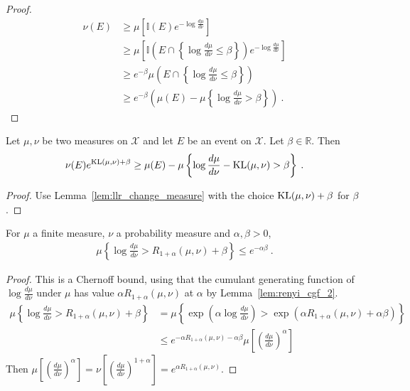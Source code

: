 \begin{proof}\leanok
\begin{align*}
\nu(E)
&\ge \mu\left[\mathbb{I}(E) e^{- \log\frac{d \mu}{d \nu} }\right]
\\
&\ge \mu\left[\mathbb{I}\left(E \cap \left\{\log\frac{d \mu}{d \nu} \le \beta\right\}\right) e^{- \log\frac{d \mu}{d \nu} }\right]
\\
&\ge e^{- \beta}\mu\left(E \cap \left\{\log\frac{d \mu}{d \nu} \le \beta\right\}\right)
\\
&\ge e^{- \beta}\left( \mu(E) - \mu\left\{ \log\frac{d \mu}{d \nu} > \beta \right\} \right)
\: .
\end{align*}
\end{proof}

\begin{corollary}
  \label{cor:kl_change_measure}
  Let $\mu, \nu$ be two measures on $\mathcal X$ and let $E$ be an event on $\mathcal X$. Let $\beta \in \mathbb{R}$. Then
  \begin{align*}
  \nu(E) e^{\operatorname{KL}(\mu, \nu) + \beta} \ge \mu(E) - \mu\left\{ \log\frac{d \mu}{d \nu} - \operatorname{KL}(\mu, \nu) > \beta \right\} \: .
  \end{align*}
\end{corollary}

\begin{proof}
Use Lemma~\ref{lem:llr_change_measure} with the choice $\operatorname{KL}(\mu, \nu) + \beta$ for $\beta$.
\end{proof}

\begin{lemma}
  \label{lem:renyi_chernoff_bound}
  \leanok
  For $\mu$ a finite measure, $\nu$ a probability measure and $\alpha, \beta > 0$,
  \begin{align*}
  \mu\left\{ \log\frac{d \mu}{d \nu} > R_{1+\alpha}(\mu, \nu) + \beta \right\}
  \le e^{- \alpha \beta}
  \: .
  \end{align*}
\end{lemma}

\begin{proof}%
{}
This is a Chernoff bound, using that the cumulant generating function of $\log\frac{d\mu}{d\nu}$ under $\mu$ has value $\alpha R_{1+\alpha}(\mu, \nu)$ at $\alpha$ by Lemma~\ref{lem:renyi_cgf_2}.
\begin{align*}
\mu\left\{ \log\frac{d \mu}{d \nu} > R_{1+\alpha}(\mu, \nu) + \beta \right\}
&= \mu\left\{ \exp\left(\alpha\log\frac{d \mu}{d \nu}\right) > \exp\left(\alpha R_{1+\alpha}(\mu, \nu) + \alpha \beta\right) \right\}
\\
&\le e^{-\alpha R_{1+\alpha}(\mu, \nu) - \alpha \beta} \mu\left[\left(\frac{d \mu}{d \nu}\right)^\alpha \right]
\end{align*}
Then $\mu\left[\left(\frac{d \mu}{d \nu}\right)^\alpha \right] = \nu\left[\left(\frac{d \mu}{d \nu}\right)^{1+\alpha} \right] = e^{\alpha R_{1+\alpha}(\mu, \nu)}$.
\end{proof}


